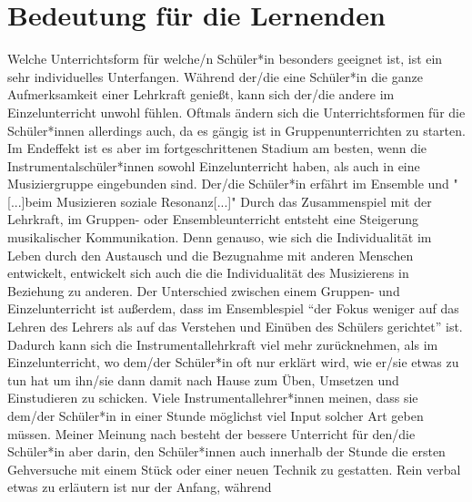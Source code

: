 

\section{Bedeutung für die Lernenden}

Welche Unterrichtsform für welche/n Schüler*in besonders geeignet ist, ist ein
sehr individuelles Unterfangen. Während der/die eine Schüler*in die ganze
Aufmerksamkeit einer Lehrkraft genießt, kann sich der/die andere im
Einzelunterricht unwohl fühlen. Oftmals ändern sich die
Unterrichtsformen für die Schüler*innen allerdings auch, da es gängig ist in
Gruppenunterrichten zu starten. Im Endeffekt ist es aber im fortgeschrittenen
Stadium am besten, wenn die Instrumentalschüler*innen sowohl Einzelunterricht
haben, als auch in eine Musiziergruppe eingebunden sind. Der/die Schüler*in
erfährt im Ensemble und "[...]beim Musizieren soziale Resonanz[...]"
\autocite[28]{mitzscherlich:musikpsychologie} Durch das Zusammenspiel mit der
Lehrkraft, im Gruppen- oder Ensembleunterricht entsteht eine Steigerung
musikalischer Kommunikation. \autocite[99]{mitzscherlich:musikpsychologie} Denn
genauso, wie sich die Individualität im Leben durch den Austausch und die
Bezugnahme mit anderen Menschen entwickelt, entwickelt sich auch die die
Individualität des Musizierens in Beziehung zu anderen. Der Unterschied zwischen
einem Gruppen- und Einzelunterricht ist außerdem, dass im Ensemblespiel
\enquote{der Fokus weniger auf das Lehren des Lehrers als auf das Verstehen und
Einüben des Schülers gerichtet} ist.
\autocite[31]{losert:die_kunst_zu_unterrichten} Dadurch kann sich die
Instrumentallehrkraft viel mehr zurücknehmen, als im Einzelunterricht, wo
dem/der Schüler*in oft nur erklärt wird, wie er/sie etwas zu tun hat um ihn/sie
dann damit nach Hause zum Üben, Umsetzen und Einstudieren zu schicken. Viele
Instrumentallehrer*innen meinen, dass sie dem/der Schüler*in in einer Stunde
möglichst viel Input solcher Art geben müssen. Meiner Meinung nach besteht der
bessere Unterricht für den/die Schüler*in aber darin, den Schüler*innen auch
innerhalb der Stunde die ersten Gehversuche mit einem Stück oder einer neuen
Technik zu gestatten. Rein verbal etwas zu erläutern ist nur der Anfang, während
